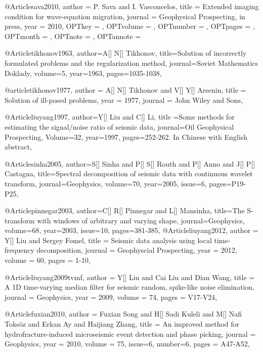 @Article{sava2010,
  author = 	 {P. Sava and I. Vasconcelos},
  title = 	 {Extended imaging condition for wave-equation migration},
  journal = 	 {Geophysical Prospecting, in press},
  year = 	 {2010},
  OPTkey = 	 {},
  OPTvolume = 	 {},
  OPTnumber = 	 {},
  OPTpages = 	 {},
  OPTmonth = 	 {},
  OPTnote = 	 {},
  OPTannote = 	 {}
}



@Article{tikhonov1963,
author={A[] N[] Tikhonov},
title={Solution of incorrectly formulated problems and the regularization method},
journal={Soviet Mathematics Doklady},
volume=5,
year=1963,
pages={1035-1038},
}

@article{tikhonov1977,
  author =	 {A[] N[] Tikhonov and V[] Y[] Arsenin},
  title =	 {Solution of ill-posed problems},
  year =	 1977,
  journal =	 {John Wiley and Sons},
}

@Article{liuyang1997,
  author={Y[] Liu and C[] Li},
  title ={Some methods for estimating the signal/noise ratio of seismic data},
  journal={Oil Geophysical Prospecting},
  Volume=32,
  year=1997,
  pages={252-262. In Chinese with English abstract},
}

@Article{sinha2005,
author={S[] Sinha and P[] S[] Routh and P[] Anno and J[] P[] Castagna},
title={Spectral decomposition of seismic data with continuous wavelet transform},
journal={Geophysics},
volume=70,
year=2005,
issue=6,
pages={P19-P25},
}

@Article{pinnegar2003,
author={C[] R[] Pinnegar and L[] Mansinha},
title={The S-transform with windows of arbitrary and varying shape},
journal={Geophysics},
volume=68,
year=2003,
issue=10,
pages={381-385},
}
@Article{liuyang2012,
  author = 	 {Y[] Liu and Sergey Fomel},
  title = 	 {Seismic data analysis using local time-frequency decomposition},
  journal = 	 {Geophyscial Prospecting},
  year = 	 2012,
  volume =	 60,
  pages =	 {1-10},
}

@Article{liuyang2009tvmf,
  author = 	 {Y[] Liu and Cai Liu and Dian Wang},
  title = 	 {A 1D time-varying median filter for seismic random, spike-like noise elimination},
  journal = 	 {Geophysics},
  year = 	 2009,
  volume =	 74,
  pages =	 {V17-V24},
}

@Article{fuxian2010,
  author = 	 {Fuxian Song and H[] Sadi Kuleli and M[] Nafi Toks\"{o}z and Erkan Ay and Haijiang Zhang},
  title = 	 {An improved method for hydrofracture-induced microseismic event detection and phase picking},
  journal = 	 {Geophysics},
  year = 	 2010,
  volume =	 75,
  issue=6,
  number=6,
  pages =	 {A47-A52},
}

